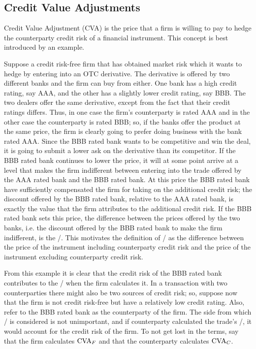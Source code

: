 \documentclass[main.tex]{subfiles}
\begin{document}
    \subsection{Credit Value Adjustments}
        Credit Value Adjustment (CVA) is the price that a firm is willing to pay 
        to hedge the counterparty credit risk of a financial instrument.
        This concept is best introduced by an example. 
        
        Suppose a credit risk-free firm that has obtained market risk 
        which it wants to hedge by entering into an OTC derivative.
        The derivative is offered by two different banks and the firm can buy from either.
        One bank has a high credit rating, say AAA, and the other has a slightly lower credit rating, say BBB. 
        The two dealers offer the same derivative, except from the fact that their credit ratings differs.
        Thus, in one case the firm's counterparty is rated AAA and in the other case the counterparty is rated BBB;
        so, if the banks offer the product at the same price, 
        the firm is clearly going to prefer doing business with the bank rated AAA.
        Since the BBB rated bank wants to be competitive and win the deal,
        it is going to submit a lower ask on the derivative than its competitor.
        If the BBB rated bank continues to lower the price, it will at some point arrive at a level
        that makes the firm indifferent between entering into the trade 
        offered by the AAA rated bank and the BBB rated bank.
        At this price the BBB rated bank have sufficiently compensated the firm for taking on the additional credit risk;
        the discount offered by the BBB rated bank, relative to the AAA rated bank, is exactly the value that the firm
        attributes to the additional credit risk. 
        If the BBB rated bank sets this price, the difference between the prices offered by the two banks,
        i.e. the discount offered by the BBB rated bank to make the firm indifferent, is the \CVA/.
        This motivates the definition of \CVA/ as the difference between the price of the instrument 
        including counterparty credit risk and the price of the instrument excluding counterparty credit risk.

        From this example it is clear that the credit risk of the BBB rated bank contributes to the \CVA/
        when the firm calculates it.
        In a transaction with two counterparties there might also be two sources of credit risk;
        so, suppose now that the firm is not credit risk-free but have a relatively low credit rating.
        Also, refer to the BBB rated bank as the counterparty of the firm.
        The side from which \CVA/ is considered is not unimportant,
        and if counterparty calculated the trade's \CVA/, it would account for the credit risk of the firm.
        To not get lost in the terms, say that the firm calculates $\CVA/_{F}$ 
        and that the counterparty calculates $\CVA/_{C}$.
\end{document}
